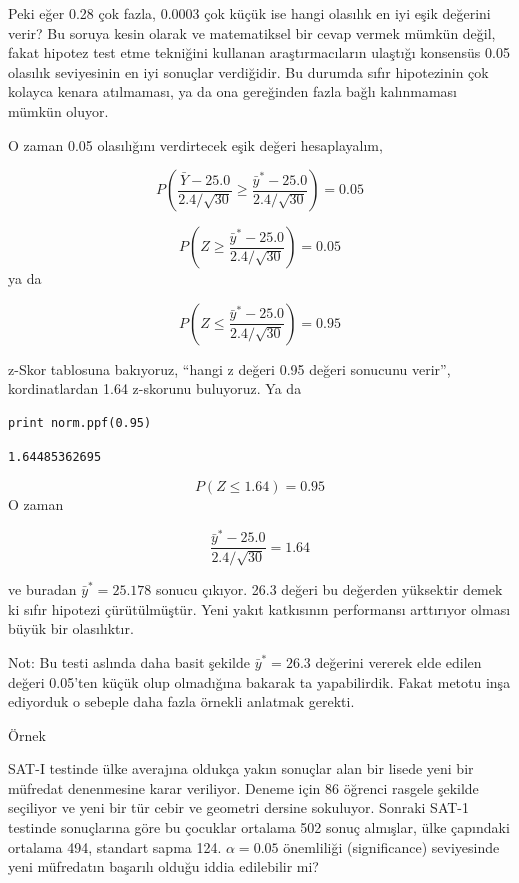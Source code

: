 \documentclass[12pt,fleqn]{article}\usepackage{../../common}
\begin{document}
Peki eğer 0.28 çok fazla, 0.0003 çok küçük ise hangi olasılık en iyi eşik
değerini verir? Bu soruya kesin olarak ve matematiksel bir cevap vermek
mümkün değil, fakat hipotez test etme tekniğini kullanan araştırmacıların
ulaştığı konsensüs 0.05 olasılık seviyesinin en iyi sonuçlar verdiğidir. Bu
durumda sıfır hipotezinin çok kolayca kenara atılmaması, ya da ona
gereğinden fazla bağlı kalınmaması mümkün oluyor.

O zaman 0.05 olasılığını verdirtecek eşik değeri hesaplayalım,

$$ P(\frac{\bar{Y} - 25.0}{2.4 / \sqrt{30}} \ge 
\frac{\bar{y}^* - 25.0}{2.4 / \sqrt{30}}) = 0.05
$$

$$ P(Z \ge  \frac{\bar{y}^* - 25.0}{2.4 / \sqrt{30}}) = 0.05
$$
ya da

$$ P(Z \le  \frac{\bar{y}^* - 25.0}{2.4 / \sqrt{30}}) = 0.95 $$

z-Skor tablosuna bakıyoruz, ``hangi z değeri 0.95 değeri sonucunu verir'',
kordinatlardan 1.64 z-skorunu buluyoruz. Ya da

\begin{verbatim}
print norm.ppf(0.95)
\end{verbatim}

\begin{verbatim}
1.64485362695
\end{verbatim}


$$ P(Z \le 1.64)  = 0.95 $$
O zaman 

$$ \frac{\bar{y}^* - 25.0}{2.4 / \sqrt{30}} = 1.64 $$

ve buradan $\bar{y}^* = 25.178$ sonucu çıkıyor. 26.3 değeri bu değerden
yüksektir demek ki sıfır hipotezi çürütülmüştür. Yeni yakıt katkısının
performansı arttırıyor olması büyük bir olasılıktır. 

Not: Bu testi aslında daha basit şekilde $\bar{y}^* = 26.3$ değerini
vererek elde edilen değeri 0.05'ten küçük olup olmadığına bakarak ta
yapabilirdik. Fakat metotu inşa ediyorduk o sebeple daha fazla örnekli
anlatmak gerekti. 

Örnek

SAT-I testinde ülke averajına oldukça yakın sonuçlar alan bir lisede yeni
bir müfredat denenmesine karar veriliyor. Deneme için 86 öğrenci rasgele
şekilde seçiliyor ve yeni bir tür cebir ve geometri dersine
sokuluyor. Sonraki SAT-1 testinde sonuçlarına göre bu çocuklar ortalama 502
sonuç almışlar, ülke çapındaki ortalama 494, standart sapma
124. $\alpha=0.05$ önemliliği (significance) seviyesinde yeni müfredatın
başarılı olduğu iddia edilebilir mi? 
\end{document}
